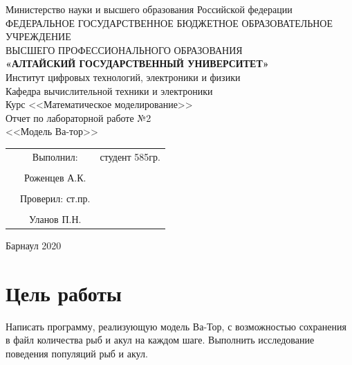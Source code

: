 \documentclass[14pt]{extarticle}
\begin{document}
\begin{center}
\hfill \break
\large{Министерство науки и высшего образования Российской федерации}\\
\footnotesize{ФЕДЕРАЛЬНОЕ ГОСУДАРСТВЕННОЕ БЮДЖЕТНОЕ ОБРАЗОВАТЕЛЬНОЕ УЧРЕЖДЕНИЕ}\\
\footnotesize{ВЫСШЕГО ПРОФЕССИОНАЛЬНОГО ОБРАЗОВАНИЯ}\\
\small{\textbf{«АЛТАЙСКИЙ ГОСУДАРСТВЕННЫЙ УНИВЕРСИТЕТ»}}\\
\hfill \break
\normalsize{Институт цифровых технологий, электроники и физики}\\
 \hfill \break
\normalsize{Кафедра вычислительной техники и электроники}\\
\hfill\break
\hfill \break
\hfill \break
\hfill \break
\large{Курс <<Математическое моделирование>>\\ Отчет по лабораторной работе №2\\ <<Модель Ва-тор>>}\\
\end{center}
\hfill \break
\hfill \break
\hfill \break
\hfill \break
\hfill \break

\normalsize{
  \begin{flushright}
    \begin{tabular}{rcr}
      & Выполнил: & студент 585гр.\\\\
      & Роженцев А.К. &\underline{\hspace{3cm}}\\\\
      & Проверил: ст.пр.\\\\
      & Уланов П.Н. & \underline{\hspace{3cm}}
    \end{tabular}
  \end{flushright}
}
\hfill \break
\hfill \break
\hfill \break
\hfill \break
\hfill \break
\begin{center} Барнаул 2020 \end{center}
\thispagestyle{empty}
\newpage
\section{Цель работы}
Написать программу, реализующую модель Ва-Тор, с возможностью сохранения в файл количества рыб и акул на каждом шаге. Выполнить исследование поведения популяций рыб и акул.
\end{document}
